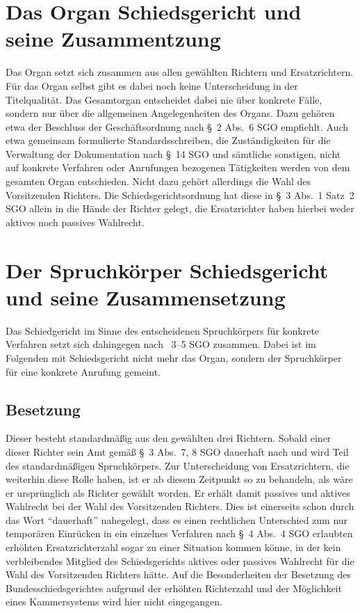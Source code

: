 \section{Das Organ Schiedsgericht und seine Zusammentzung}
\label{Zusammensetzung:Organ}
Das Organ setzt sich zusammen aus allen gewählten Richtern und Ersatzrichtern.
Für das Organ selbst gibt es dabei noch keine Unterscheidung in der Titelqualität.
Das Gesamtorgan entscheidet dabei nie über konkrete Fälle, sondern nur über die allgemeinen Angelegenheiten des Organs.
Dazu gehören etwa der Beschluss der Geschäftsordnung nach \S~2 Abs.~6 SGO empfiehlt.
Auch etwa gemeinsam formulierte Standardsschreiben, die Zuständigkeiten für die Verwaltung der Dokumentation nach \S~14 SGO und sämtliche sonstigen, nicht auf konkrete Verfahren oder Anrufungen bezogenen Tätigkeiten werden von dem gesamten Organ entschieden.
Nicht dazu gehört allerdings die Wahl des Vorsitzenden Richters.
Die Schiedsgerichtsordnung hat diese in \S~3 Abs.~1 Satz~2 SGO allein in die Hände der Richter gelegt, die Ersatzrichter haben hierbei weder aktives noch passives Wahlrecht.

\section{Der Spruchkörper Schiedsgericht und seine Zusammensetzung}
\label{Zusammensetzung:Spruchkoerper}
Das Schiedgericht im Sinne des entscheidenen Spruchkörpers für konkrete Verfahren setzt sich dahingegen nach \SSS~3--5 SGO zusammen. Dabei ist im Folgenden mit Schiedsgericht nicht mehr das Organ, sondern der Spruchkörper für eine konkrete Anrufung gemeint.

\subsection{Besetzung}
\label{Zusammensetzung:Spruchkoerper:Besetzung}
Dieser besteht standardmäßig aus den gewählten drei Richtern.
Sobald einer dieser Richter sein Amt gemäß \S~3 Abs.~7, 8 SGO dauerhaft nach und wird Teil des standardmäßigen Spruchkörpers.
Zur Unterscheidung von Ersatzrichtern, die weiterhin diese Rolle haben, ist er ab diesem Zeitpunkt so zu behandeln, als wäre er ursprünglich als Richter gewählt worden.
Er erhält damit passives und aktives Wahlrecht bei der Wahl des Vorsitzenden Richters.
Dies ist einerseits schon durch das Wort \enquote{dauerhaft} nahegelegt, dass es einen rechtlichen Unterschied zum nur temporären Einrücken in ein einzelnes Verfahren nach \S~4 Abs.~4 SGO erlaubten erhöhten Ersatzrichterzahl sogar zu einer Situation kommen könne, in der kein verbleibendes Mitglied des Schiedsgerichts aktives oder passives Wahlrecht für die Wahl des Vorsitzenden Richters hätte.
Auf die Besonderheiten der Besetzung des Bundesschiedsgerichtes aufgrund der erhöhten Richterzahl und der Möglichkeit eines Kammersystems wird hier nicht eingegangen.

